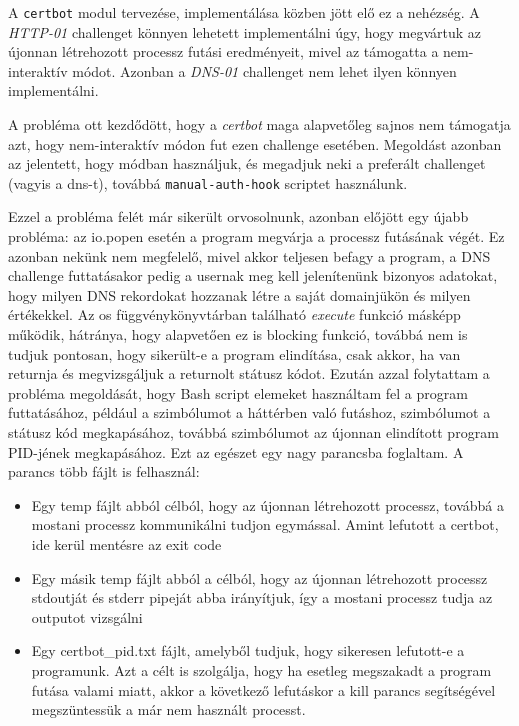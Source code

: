 A \texttt{certbot} modul tervezése, implementálása közben jött elő ez a nehézség. A \textit{HTTP-01} challenget könnyen lehetett implementálni úgy, hogy megvártuk az újonnan létrehozott processz futási eredményeit, mivel az támogatta a nem-interaktív módot. Azonban a \textit{DNS-01} challenget nem lehet ilyen könnyen implementálni.

A probléma ott kezdődött, hogy a \textit{certbot} maga alapvetőleg sajnos nem támogatja azt, hogy nem-interaktív módon fut ezen challenge esetében. Megoldást azonban az jelentett, hogy \texttt{} módban használjuk, és megadjuk neki a preferált challenget (vagyis a dns-t), továbbá \texttt{manual-auth-hook} scriptet használunk. 


Ezzel a probléma felét már sikerült orvosolnunk, azonban előjött egy újabb probléma: az io.popen esetén a program megvárja a processz futásának végét. Ez azonban nekünk nem megfelelő, mivel akkor teljesen befagy a program, a DNS challenge futtatásakor pedig a usernak meg kell jelenítenünk bizonyos adatokat, hogy milyen DNS rekordokat hozzanak létre a saját domainjükön és milyen értékekkel. Az os függvénykönyvtárban található \textit{execute} funkció másképp működik, hátránya, hogy alapvetően ez is blocking funkció, továbbá nem is tudjuk pontosan, hogy sikerült-e a program elindítása, csak akkor, ha van returnja és megvizsgáljuk a returnolt státusz kódot.
Ezután azzal folytattam a probléma megoldását, hogy Bash script elemeket használtam fel a program futtatásához, például a \texttt{\detokenize{&}} szimbólumot a háttérben való futáshoz, \texttt{} szimbólumot a státusz kód megkapásához, továbbá \texttt{\detokenize{$!}} szimbólumot az újonnan elindított program PID-jének megkapásához. Ezt az egészet egy nagy parancsba foglaltam. A parancs több fájlt is felhasznál:
\begin{itemize}
	\item Egy temp fájlt abból célból, hogy az újonnan létrehozott processz, továbbá a mostani processz kommunikálni tudjon egymással. Amint lefutott a certbot, ide kerül mentésre az exit code
	\item Egy másik temp fájlt abból a célból, hogy az újonnan létrehozott processz stdoutját és stderr pipeját abba irányítjuk, így a mostani processz tudja az outputot vizsgálni
	\item Egy certbot\_pid.txt fájlt, amelyből tudjuk, hogy sikeresen lefutott-e a programunk. Azt a célt is szolgálja, hogy ha esetleg megszakadt a program futása valami miatt, akkor a következő lefutáskor a kill parancs segítségével megszüntessük a már nem használt processt.
\end{itemize}

